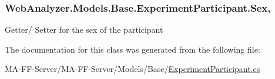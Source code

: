 \subsubsection[{Sex}]{ Web\+Analyzer.\+Models.\+Base.\+Experiment\+Participant.\+Sex\hspace{0.3cm}{\ttfamily [get]}, {\ttfamily [set]}}\label{class_web_analyzer_1_1_models_1_1_base_1_1_experiment_participant_af836bfc33d73671eec06864ce395b9a2}


Getter/ Setter for the sex of the participant 



The documentation for this class was generated from the following file\+:\begin{DoxyCompactItemize}
\item 
M\+A-\/\+F\+F-\/\+Server/\+M\+A-\/\+F\+F-\/\+Server/\+Models/\+Base/\hyperlink{_experiment_participant_8cs}{Experiment\+Participant.\+cs}\end{DoxyCompactItemize}

